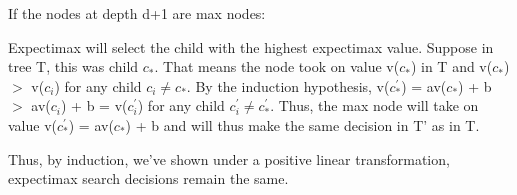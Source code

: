 \documentclass[11pt,a4paper]{article}
\begin{document}
If the nodes at depth d+1 are max nodes:

Expectimax will select the child with the highest expectimax value. Suppose in tree T, this was child $c_{*}$. That means the node took on value v($c_{*}$) in T and v($c_{*}$) $>$ v($c_{i}$) for any child $c_{i} \neq c_{*}$.  By the induction hypothesis, v($c_{*}^{'}$) = av($c_{*}$) + b $>$ av($c_{i}$) + b = v($c_{i}^{'}$) for any child $c_{i}^{'} \neq c_{*}^{'}$. Thus, the max node will take on value v($c_{*}^{'}$) = av($c_{*}$) + b and will thus make the same decision in T' as in T.

Thus, by induction, we've shown under a positive linear transformation, expectimax search decisions remain the same.
\end{document}

